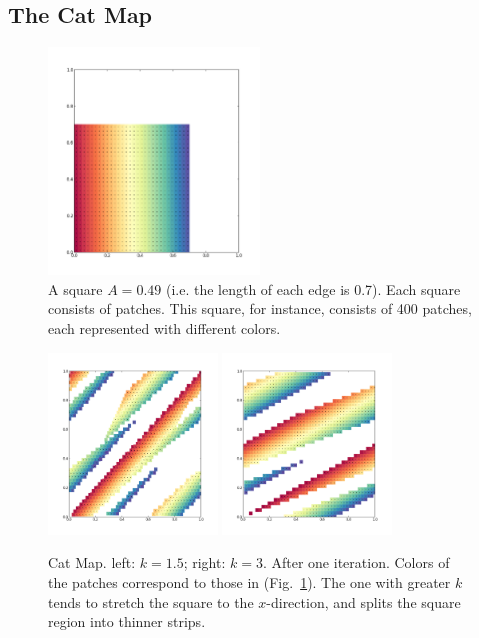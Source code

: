 \documentclass[12pt]{reedmcm}
\begin{document}
\subsection{The Cat Map}
\begin{figure}[t]
  \centering
  \includegraphics[width=0.5\textwidth]{square_049_900}
  \caption{A square $A = 0.49$ (i.e. the length of each edge is 0.7). Each square consists of patches. This square, for instance, consists of 400 patches, each represented with different colors.}
  \label{fig:square}
\end{figure}
%
\begin{figure}[t]
  \centering
  \includegraphics[width=0.4\textwidth]{catmap_1-5}
  \hspace{2cm}
  \includegraphics[width=0.4\textwidth]{catmap_3}
  \caption{Cat Map. left: $k=1.5$; right: $k = 3$. After one iteration. 
    Colors of the patches correspond to those in (Fig.~\ref{fig:square}).
    The one with greater $k$ tends to stretch the square to the $x$-direction, and splits the square region into thinner strips.
  }
  \label{fig:catmap_demo1}
\end{figure}
\end{document}
